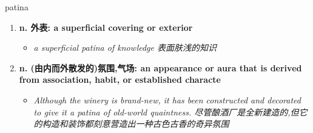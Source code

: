 
\begin{frame}
{\huge patina}
\begin{center}
\begin{enumerate}\Large
  \item \textbf{n. 外表: a superficial covering or exterior}
  \begin{itemize}
    \item \em{\Large{a superficial patina of knowledge 表面肤浅的知识}}
  \end{itemize}
  \item \textbf{n. (由内而外散发的)氛围,气场: an appearance or aura that is derived from association, habit, or established characte}
  \begin{itemize}
    \item \em{\Large{Although the winery is brand-new, it has been constructed and decorated to give it a patina of old-world quaintness. 尽管酿酒厂是全新建造的,但它的构造和装饰都刻意营造出一种古色古香的奇异氛围}}
  \end{itemize}
\end{enumerate}
\end{center}
\end{frame}

